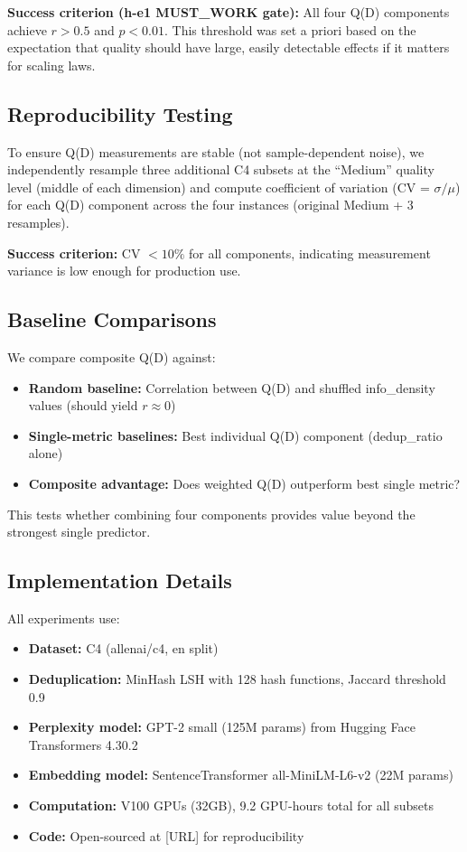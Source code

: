 \textbf{Success criterion (h-e1 MUST\_WORK gate):} All four Q(D) components achieve $r > 0.5$ and $p < 0.01$. This threshold was set a priori based on the expectation that quality should have large, easily detectable effects if it matters for scaling laws.

\subsection{Reproducibility Testing}

To ensure Q(D) measurements are stable (not sample-dependent noise), we independently resample three additional C4 subsets at the ``Medium'' quality level (middle of each dimension) and compute coefficient of variation (CV = $\sigma/\mu$) for each Q(D) component across the four instances (original Medium + 3 resamples).

\textbf{Success criterion:} CV $< 10\%$ for all components, indicating measurement variance is low enough for production use.

\subsection{Baseline Comparisons}

We compare composite Q(D) against:

\begin{itemize}
\item \textbf{Random baseline:} Correlation between Q(D) and shuffled info\_density values (should yield $r \approx 0$)
\item \textbf{Single-metric baselines:} Best individual Q(D) component (dedup\_ratio alone)
\item \textbf{Composite advantage:} Does weighted Q(D) outperform best single metric?
\end{itemize}

This tests whether combining four components provides value beyond the strongest single predictor.

\subsection{Implementation Details}

All experiments use:

\begin{itemize}
\item \textbf{Dataset:} C4 (allenai/c4, en split)
\item \textbf{Deduplication:} MinHash LSH with 128 hash functions, Jaccard threshold 0.9
\item \textbf{Perplexity model:} GPT-2 small (125M params) from Hugging Face Transformers 4.30.2
\item \textbf{Embedding model:} SentenceTransformer all-MiniLM-L6-v2 (22M params)
\item \textbf{Computation:} V100 GPUs (32GB), 9.2 GPU-hours total for all subsets
\item \textbf{Code:} Open-sourced at [URL] for reproducibility
\end{itemize}

